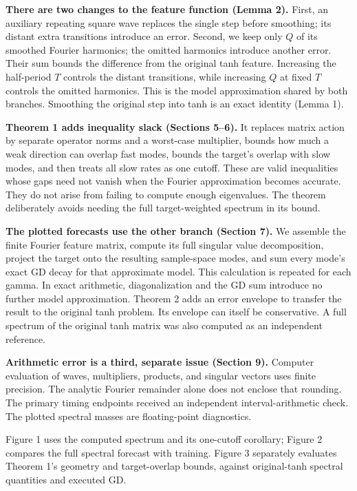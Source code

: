 \documentclass[11pt]{article}
\theoremstyle{definition}
\begin{document}
\textbf{There are two changes to the feature function (Lemma 2).}
First, an auxiliary repeating square wave replaces the single step before
smoothing; its distant extra transitions introduce an error. Second, we keep
only $Q$ of its smoothed Fourier harmonics; the omitted harmonics introduce
another error. Their sum bounds the difference from the original tanh feature.
Increasing the half-period $T$ controls the distant transitions, while
increasing $Q$ at fixed $T$ controls the omitted harmonics. This is the model
approximation shared by both branches. Smoothing the original step into tanh
is an exact identity (Lemma 1).

\textbf{Theorem 1 adds inequality slack (Sections 5--6).}
It replaces matrix action by separate operator norms and a worst-case
multiplier, bounds how much a weak direction can overlap fast modes, bounds
the target's overlap with slow modes, and then treats all slow rates as one
cutoff. These are valid inequalities whose gaps need not vanish when the
Fourier approximation becomes accurate. They do not arise from failing to
compute enough eigenvalues. The theorem deliberately avoids needing the full
target-weighted spectrum in its bound.

\textbf{The plotted forecasts use the other branch (Section 7).}
We assemble the finite Fourier feature matrix, compute its full singular value
decomposition, project the target onto the resulting sample-space modes, and
sum every mode's exact GD decay for that approximate model. This calculation
is repeated for each gamma. In exact arithmetic, diagonalization and the GD
sum introduce no further model approximation. Theorem 2 adds an error envelope
to transfer the result to the original tanh problem. Its envelope can itself
be conservative. A full spectrum of the original tanh matrix was also computed
as an independent reference.

\textbf{Arithmetic error is a third, separate issue (Section 9).}
Computer evaluation of waves, multipliers, products, and singular vectors uses
finite precision. The analytic Fourier remainder alone does not enclose that
rounding. The primary timing endpoints received an independent
interval-arithmetic check. The plotted spectral masses are floating-point
diagnostics.

Figure 1 uses the computed spectrum and its one-cutoff corollary; Figure 2
compares the full spectral forecast with training. Figure 3 separately
evaluates Theorem 1's geometry and target-overlap bounds, against original-tanh
spectral quantities and executed GD.
\end{document}
